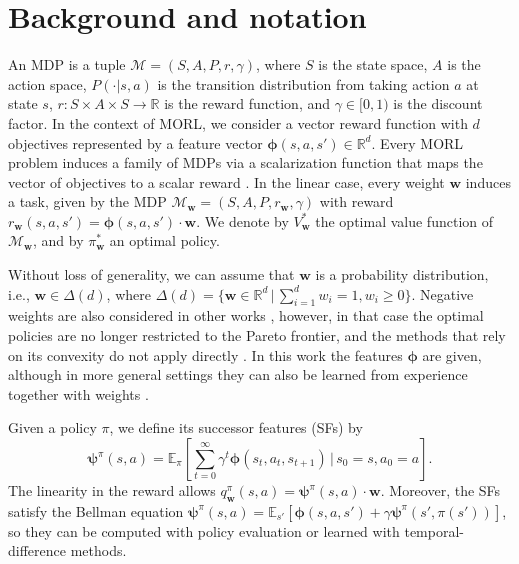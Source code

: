 \documentclass[11pt]{article}
\newcommand{\vphi}{\bm{\phi}}      %
\newcommand{\vpsi}{\bm{\psi}}      %
\begin{document}
\section{Background and notation}\label{sec:Background}


An MDP is a tuple $\mathcal{M} = (S, A, P, r, \gamma)$, where $S$ is the state space, $A$ is the action space, $P(\cdot | s, a)$ is the transition distribution from taking action $a$ at state $s$, $r : S \times A \times S \to \mathbb{R}$ is the reward function, and $\gamma \in [0,1)$ is the discount factor. In the context of MORL, we consider a vector reward function with $d$ objectives represented by a feature vector $\vphi(s,a,s') \in \mathbb{R}^d$. Every MORL problem induces a family of MDPs via a scalarization function that maps the vector of objectives to a scalar reward \cite{roijers_survey_2013}. In the linear case, every weight $\mathbf{w}$ induces a task, given by the MDP $\mathcal{M}_{\mathbf{w}} = (S, A, P, r_{\mathbf{w}}, \gamma)$ with reward $r_{\mathbf{w}}(s, a, s') = \vphi(s, a, s') \cdot \mathbf{w}.$ We denote by $V^*_{\mathbf{w}}$ the optimal value function of $\mathcal{M}_{\mathbf{w}}$, and by $\pi^*_{\mathbf{w}}$ an optimal policy.

Without loss of generality, we can assume that $\mathbf{w}$ is a probability distribution, i.e., $\mathbf{w} \in \Delta(d)$, where $\Delta(d) = \{\mathbf{w} \in \mathbb{R}^d \,|\, \sum_{i=1}^d w_i = 1, w_i \geq 0 \}$. Negative weights are also considered in other works \cite{barreto_fast_2020}, however, in that case the optimal policies are no longer restricted to the Pareto frontier, and the methods that rely on its convexity do not apply directly \cite{moffaert_multi-objective_2014,michailidis_scalable_2026}. In this work the features $\vphi$ are given, although in more general settings they can also be learned from experience together with weights \cite{barreto_fast_2020,carvalho_combining_2023}.

Given a policy $\pi$, we define its successor features (SFs) \cite{barreto_successor_2017} by
\begin{equation}
    \vpsi^\pi(s,a) = \mathbb{E}_\pi \left[ \sum_{t = 0}^\infty \gamma^t \vphi(s_t, a_t, s_{t+1}) \,\Big|\, s_0 = s, a_0 = a \right].
\end{equation}
The linearity in the reward allows $q_{\mathbf{w}}^\pi(s,a) = \vpsi^\pi(s,a) \cdot \mathbf{w}$. Moreover, the SFs satisfy the Bellman equation $\vpsi^\pi(s,a) = \mathbb{E}_{s'}\left[\vphi(s,a,s') + \gamma \vpsi^\pi(s', \pi(s'))\right]$, so they can be computed with policy evaluation or learned with temporal-difference methods.
\end{document}
